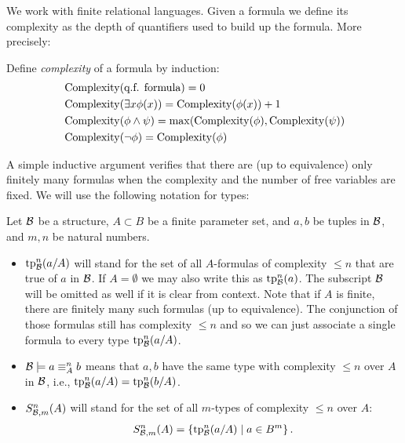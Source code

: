 We work with finite relational languages.
Given a formula we define its complexity as the depth of quantifiers used to build up the formula. More precisely:
\begin{Definition}
  Define \emph{complexity} of a formula by induction:
  \begin{align*}
    &\operatorname{Complexity}(\text{q.f. formula}) = 0 \\
    &\operatorname{Complexity}(\exists x \phi(x)) = \operatorname{Complexity}(\phi(x)) + 1 \\
    &\operatorname{Complexity}(\phi \wedge \psi) = \max(\operatorname{Complexity}(\phi), \operatorname{Complexity}(\psi)) \\
    &\operatorname{Complexity}(\neg \phi) = \operatorname{Complexity}(\phi)
  \end{align*}
\end{Definition}
A simple inductive argument verifies that there are (up to equivalence) only finitely many formulas when the complexity and the number of free variables are fixed.
We will use the following notation for types:
\begin{Definition} Let $\mathcal B$ be a structure, $A \subset B$ be a finite parameter set, and $a,b$ be tuples in $\mathcal B$, and $m, n$ be natural numbers.
  \begin{itemize}
  \item $\operatorname{tp}^n_{\mathcal B}(a/A)$ will stand for the set of all $A$-formulas of complexity $\leq n$ that are true of $a$ in $\mathcal B$.
    If $A = \emptyset$ we may also write this as $\operatorname{tp}^n_{\mathcal B}(a)$.
    The subscript $\mathcal B$ will be omitted as well if it is clear from context.
    Note that if $A$ is finite, there are finitely many such formulas (up to equivalence).
    The conjunction of those formulas still has complexity $\leq n$ and so we can just associate a single formula to every type $\operatorname{tp}^n_{\mathcal B}(a/A)$.
  \item $\mathcal B \models a \equiv^n_A b$ means that $a,b$ have the same type with complexity $\leq n$ over $A$ in $\mathcal B$, i.e., $\operatorname{tp}^n_{\mathcal B}(a/A) = \operatorname{tp}^n_{\mathcal B}(b/A)$.
  \item $S^n_{\mathcal B, m}(A)$ will stand for the set of all $m$-types of complexity $\leq n$ over $A$:
    \begin{align*}
      S^n_{\mathcal B, m}(A) = \left\{\operatorname{tp}^n_{\mathcal B}(a/A) \mid a \in B^m\right\}.
    \end{align*}
  \end{itemize}
\end{Definition}

